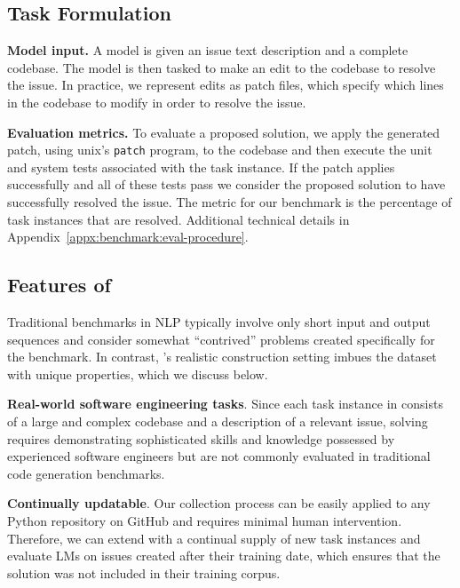 \subsection{Task Formulation}
\label{sec:benchmark:task-formulation}

\textbf{Model input.}
A model is given an issue text description and a complete codebase.
The model is then tasked to make an edit to the codebase to resolve the issue.
In practice, we represent edits as patch files, which specify which lines in the codebase to modify in order to resolve the issue.

\textbf{Evaluation metrics.}
To evaluate a proposed solution, we apply the generated patch, using unix's \texttt{patch} program, to the codebase and then execute the unit and system tests associated with the task instance.
If the patch applies successfully and all of these tests pass we consider the proposed solution to have successfully resolved the issue.
The metric for our benchmark is the percentage of task instances that are resolved.
Additional technical details in Appendix~\ref{appx:benchmark:eval-procedure}.

\subsection{Features of \benchmark{}}
\label{sec:benchmark:features-of-benchmark}

Traditional benchmarks in NLP typically involve only short input and output sequences and consider somewhat ``contrived'' problems created specifically for the benchmark.
In contrast, \benchmark{}'s realistic construction setting imbues the dataset with unique properties, which we discuss below.

\textbf{Real-world software engineering tasks}.
Since each task instance in \benchmark{} consists of a large and complex codebase and a description of a relevant issue, solving \benchmark{} requires demonstrating sophisticated skills and knowledge possessed by experienced software engineers but are not commonly evaluated in traditional code generation benchmarks.

\textbf{Continually updatable}.
Our collection process can be easily applied to any Python repository on GitHub and requires minimal human intervention.
Therefore, we can extend \benchmark{} with a continual supply of new task instances and evaluate LMs on issues created after their training date, which ensures that the solution was not included in their training corpus.

